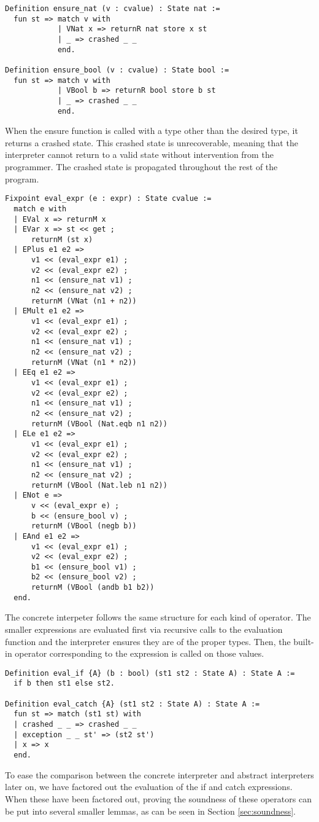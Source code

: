 \begin{verbatim}
Definition ensure_nat (v : cvalue) : State nat :=
  fun st => match v with
            | VNat x => returnR nat store x st
            | _ => crashed _ _
            end.
            
Definition ensure_bool (v : cvalue) : State bool :=
  fun st => match v with
            | VBool b => returnR bool store b st
            | _ => crashed _ _
            end.
\end{verbatim}

When the ensure function is called with a type other than the desired type, it
returns a crashed state. This crashed state is unrecoverable, meaning that the
interpreter cannot return to a valid state without intervention from the
programmer. The crashed state is propagated throughout the rest of the program.

\begin{verbatim}
Fixpoint eval_expr (e : expr) : State cvalue :=
  match e with
  | EVal x => returnM x
  | EVar x => st << get ;
      returnM (st x)
  | EPlus e1 e2 => 
      v1 << (eval_expr e1) ;
      v2 << (eval_expr e2) ;
      n1 << (ensure_nat v1) ;
      n2 << (ensure_nat v2) ;
      returnM (VNat (n1 + n2))
  | EMult e1 e2 =>
      v1 << (eval_expr e1) ;
      v2 << (eval_expr e2) ;
      n1 << (ensure_nat v1) ;
      n2 << (ensure_nat v2) ;
      returnM (VNat (n1 * n2))
  | EEq e1 e2 =>
      v1 << (eval_expr e1) ;
      v2 << (eval_expr e2) ;
      n1 << (ensure_nat v1) ;
      n2 << (ensure_nat v2) ;
      returnM (VBool (Nat.eqb n1 n2))
  | ELe e1 e2 =>
      v1 << (eval_expr e1) ;
      v2 << (eval_expr e2) ;
      n1 << (ensure_nat v1) ;
      n2 << (ensure_nat v2) ;
      returnM (VBool (Nat.leb n1 n2))
  | ENot e =>
      v << (eval_expr e) ;
      b << (ensure_bool v) ;
      returnM (VBool (negb b))
  | EAnd e1 e2 =>
      v1 << (eval_expr e1) ;
      v2 << (eval_expr e2) ;
      b1 << (ensure_bool v1) ;
      b2 << (ensure_bool v2) ;
      returnM (VBool (andb b1 b2))
  end.
\end{verbatim}

The concrete interpeter follows the same structure for each kind of operator.
The smaller expressions are evaluated first via recursive calls to the
evaluation function and the interpreter
ensures they are of the proper types. Then, the built-in operator corresponding
to the expression is called on those values.

\begin{verbatim}
Definition eval_if {A} (b : bool) (st1 st2 : State A) : State A := 
  if b then st1 else st2.

Definition eval_catch {A} (st1 st2 : State A) : State A :=
  fun st => match (st1 st) with
  | crashed _ _ => crashed _ _
  | exception _ _ st' => (st2 st')
  | x => x
  end.
\end{verbatim}
To ease the comparison between the concrete interpreter and abstract
interpreters later on, we have factored out the evaluation of the if and catch
expressions. When these have been factored out, proving the soundness of these
operators can be put into several smaller lemmas, as can be seen in Section
\ref{sec:soundness}.

